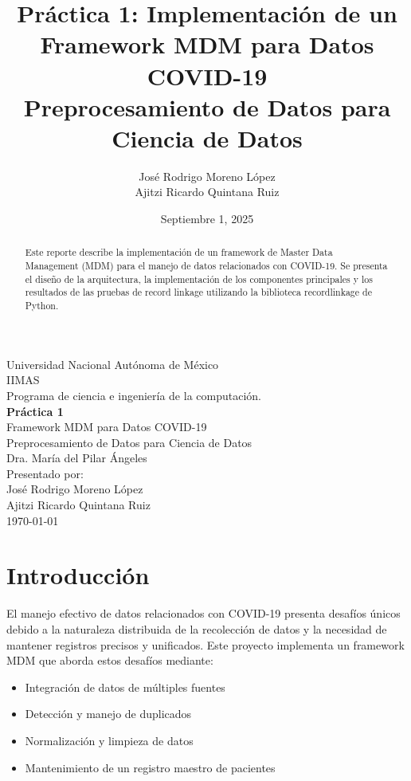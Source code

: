 \documentclass[12pt]{article}
\title{Práctica 1: Implementación de un Framework MDM para Datos COVID-19\\
        \large Preprocesamiento de Datos para Ciencia de Datos}
\author{José Rodrigo Moreno López \\ Ajitzi Ricardo Quintana Ruiz}
\date{Septiembre 1, 2025}
\newcommand{\institution}{Universidad Nacional Autónoma de México}
\newcommand{\faculty}{IIMAS}
\newcommand{\program}{Programa de ciencia e ingeniería de la computación.}
\begin{document}
\begin{titlepage}
    \begin{center}
        {\Large \institution}\\[2ex]
        {\Large \faculty}\\[2ex]
        {\Large \program}\\[4ex]
        \vfill
        {\huge \textbf{Práctica 1}}\\[2ex]
        {\Large Framework MDM para Datos COVID-19}\\[4ex]
        \vfill
        {\Large Preprocesamiento de Datos para Ciencia de Datos}\\[4ex]
        {\Large Dra. María del Pilar Ángeles}\\[4ex]
        \vfill
        {\Large Presentado por:}\\[2ex]
        {\Large José Rodrigo Moreno López}\\
        {\Large Ajitzi Ricardo Quintana Ruiz}\\[4ex]
        {\Large \today}
    \end{center}
\end{titlepage}

\maketitle
\tableofcontents
\newpage

\begin{abstract}
Este reporte describe la implementación de un framework de Master Data Management (MDM) 
para el manejo de datos relacionados con COVID-19. Se presenta el diseño de la arquitectura, 
la implementación de los componentes principales y los resultados de las pruebas de 
record linkage utilizando la biblioteca recordlinkage de Python.
\end{abstract}

\section{Introducción}
El manejo efectivo de datos relacionados con COVID-19 presenta desafíos únicos debido 
a la naturaleza distribuida de la recolección de datos y la necesidad de mantener 
registros precisos y unificados. Este proyecto implementa un framework MDM que 
aborda estos desafíos mediante:

\begin{itemize}
    \item Integración de datos de múltiples fuentes
    \item Detección y manejo de duplicados
    \item Normalización y limpieza de datos
    \item Mantenimiento de un registro maestro de pacientes
\end{itemize}
\end{document}
